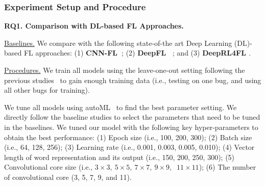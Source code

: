 \subsubsection{Experiment Setup and Procedure}
\hspace{1cm}

{\bf RQ1. Comparison with DL-based FL Approaches.}

\underline{Baselines.} We compare {\tool} with the following state-of-the art Deep Learning (DL)-based FL approaches: (1) \textbf{CNN-FL~\cite{zhang2019cnn}}; (2) {\bf DeepFL~\cite{DeepFL}} ; and (3) {\bf DeepRL4FL \cite{icse21-fl}}.


\underline{Procedures.}
We train all models using the leave-one-out setting following the
previous studies~\cite{DeepFL, TraPT} to gain enough training data
(i.e., testing on one bug, and using all other bugs for
training).




We tune all models using autoML~\cite{NNI} to find the best parameter
setting. We directly follow the baseline studies to select the
parameters that need to be tuned in the baselines.
We tuned our model with the following key hyper-parameters to obtain
the best performance: (1) Epoch size (i.e., 100, 200, 300); (2) Batch
size (i.e., 64, 128, 256); (3) Learning rate (i.e., 0.001, 0.003,
0.005, 0.010); (4) Vector length of word representation and its output
(i.e., 150, 200, 250, 300); (5) Convolutional core size (i.e.,
$3\times3,\:5\times5,\:7\times7,\:9\times9,$ $\:11\times11$); (6)
The number of convolutional core (3, 5, 7, 9, and 11).

